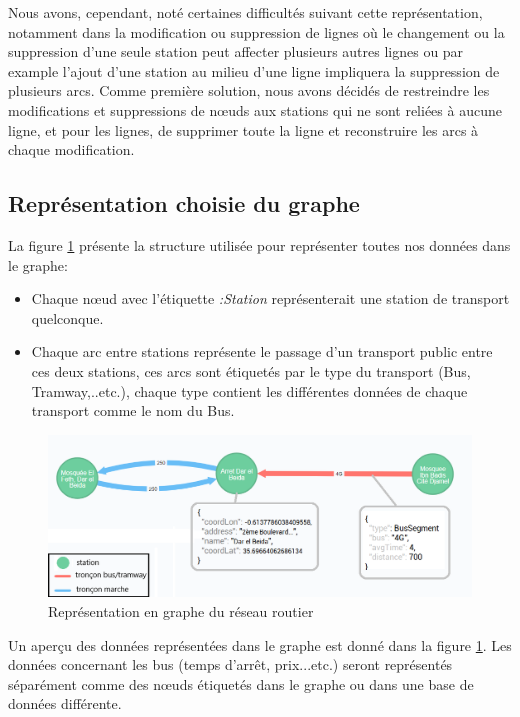 \begin{itemize}
	Nous avons, cependant, noté certaines difficultés suivant cette représentation, notamment dans la modification ou suppression de lignes où le changement ou la suppression d'une seule station peut affecter plusieurs autres lignes ou par example l'ajout d'une station au milieu d'une ligne impliquera la suppression de plusieurs arcs.
	Comme première solution, nous avons décidés de restreindre les modifications et suppressions de nœuds aux stations qui ne sont reliées à aucune ligne, et pour les lignes, de supprimer toute la ligne et reconstruire les arcs à chaque modification.
	     
\end{itemize}
\subsection{Représentation choisie du graphe}
La figure \ref{fig:structGraph} présente la structure utilisée pour représenter toutes nos données dans le graphe:
\begin{itemize}
	\item Chaque nœud avec l'étiquette \emph{:Station} représenterait une station de transport quelconque.
	\item Chaque arc entre stations représente le passage d'un transport public entre ces deux stations, ces arcs sont étiquetés par le type du transport (Bus, Tramway,..etc.), chaque type contient les différentes données de chaque transport comme le nom du Bus.
\end{itemize}

\begin{figure}[h!]
	\center
	\includegraphics[width=\textwidth]{img/structureGraphe.png}
	\caption{Représentation en graphe du réseau routier}
	\label{fig:structGraph}
\end{figure}

Un aperçu des données représentées dans le graphe est donné dans la figure \ref{fig:structGraph}. Les données concernant les bus (temps d'arrêt, prix...etc.) seront représentés séparément comme des nœuds étiquetés dans le graphe ou dans une base de données différente.

